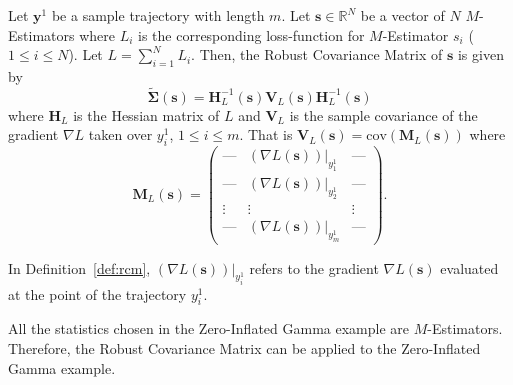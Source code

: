 \begin{definition}
    \label{def:rcm}
    Let $\pmb{y}^1$ be a sample trajectory with length $m$. Let $\pmb{s} \in \mathbb{R}^N$ be a vector of $N$ $M$-Estimators where $L_i$ is the corresponding loss-function for $M$-Estimator $s_i$ ($1 \leq i \leq N$). Let $L = \sum_{i=1}^N L_i$. Then, the Robust Covariance Matrix of $\pmb{s}$ is given by
    \[ \tilde{\pmb{\Sigma}}(\pmb{s}) = \pmb{H}_L^{-1}(\pmb{s}) \pmb{V}_{L}(\pmb{s}) \pmb{H}_{L}^{-1}(\pmb{s}) \]
    where $\pmb{H}_{L}$ is the Hessian matrix of $L$ and $\pmb{V}_{L}$ is the sample covariance of the gradient $\nabla L$ taken over $y_i^1$, $1 \leq i \leq m$. That is $\pmb{V}_{L}(\pmb{s}) = \text{cov}(\pmb{M}_{L}(\pmb{s}))$ where
    \[ \pmb{M}_{L}(\pmb{s}) = \begin{pmatrix}
    \text{---} & (\nabla L(\pmb{s}))|_{y^1_1} & \text{---} \\
    \text{---} & (\nabla L(\pmb{s}))|_{y^1_2} & \text{---} \\
    \vdots & \vdots & \vdots \\
    \text{---} & (\nabla L(\pmb{s}))|_{y^1_m} & \text{---} \end{pmatrix}. \]
\end{definition}

In Definition~\ref{def:rcm}, $(\nabla L(\pmb{s}))|_{y^1_i}$ refers to the gradient $\nabla L(\pmb{s})$ evaluated at the point of the trajectory $y^1_i$.

All the statistics chosen in the Zero-Inflated Gamma example are $M$-Estimators. Therefore, the Robust Covariance Matrix can be applied to the Zero-Inflated Gamma example.

